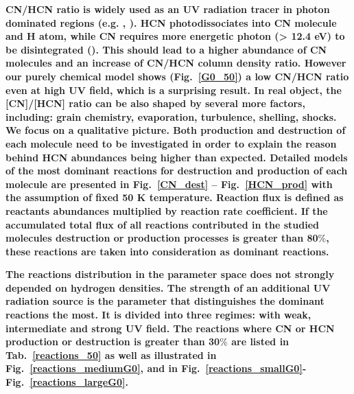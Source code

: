 \documentclass{aa}
\begin{document}

\textbf{CN/HCN ratio is widely used as an UV radiation tracer in photon dominated regions (e.g. \citealt{Thi04}, \citealt{Han15}).
HCN photodissociates into CN molecule and H atom, while CN requires more energetic photon (> 12.4
eV) to be disintegrated (\citealt{vDi87}). This should lead to a higher abundance of CN molecules and
an increase of CN/HCN column density ratio. However our purely chemical model shows (Fig.~\ref{G0_50}) a low CN/HCN ratio even at high UV field, which is a surprising result. In real object, the [CN]/[HCN] ratio can be also shaped by several more factors, including: grain chemistry, evaporation, turbulence, shelling, shocks. We focus on a qualitative picture. Both production and destruction of each molecule need to be investigated in order to explain the reason behind HCN abundances being higher than expected. Detailed models of the most dominant
reactions for destruction and production of each molecule are presented in Fig.~\ref{CN_dest} –
Fig.~\ref{HCN_prod} with the assumption of fixed 50 K temperature. Reaction flux is defined as
reactants abundances multiplied by reaction rate coefficient. If the accumulated total flux of all reactions contributed in the studied molecules destruction or production processes is greater than 80$\%$, these reactions \textbf{are} taken into consideration as dominant reactions.}

\textbf{The reactions distribution in the parameter space does not strongly depended on hydrogen
densities. The strength of an additional UV radiation source is the parameter that distinguishes the
dominant reactions the most. It is divided into three regimes: with weak, intermediate and strong
UV field. The reactions where CN or HCN production or destruction is greater than 30$\%$ are listed
in Tab.~\ref{reactions_50} as well as illustrated in Fig.~\ref{reactions_mediumG0}, and in Fig.~\ref{reactions_smallG0}-
Fig.~\ref{reactions_largeG0}.}
\end{document}
